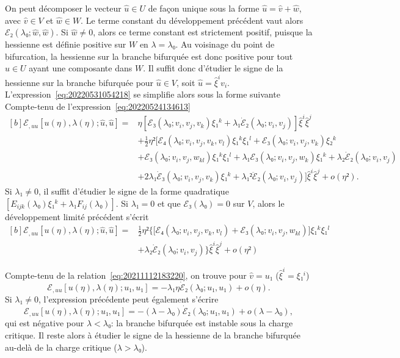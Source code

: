 \documentclass[12pt, final]{scrartcl}
\theoremstyle{definition}
\begin{document}
On peut décomposer le vecteur \(\hat{u}∈U\) de façon unique sous la forme
\(\hat{u} = \hat{v} + \hat{w}\), avec \(\hat{v}∈V\) et \(\hat{w}∈W\). Le terme
constant du développement précédent vaut alors \(ℰ₂(λ₀; \hat{w}, \hat{w})\). Si
\(\hat{w} ≠ 0\), alors ce terme constant est strictement positif, puisque la
hessienne est définie positive sur \(W\) en \(λ = λ₀\). Au voisinage du point de
bifurcation, la hessienne sur la branche bifurquée est donc positive pour tout
\(\hat{u}∈U\) ayant une composante dans \(W\). Il suffit donc d'étudier le signe
de la hessienne sur la branche bifurquée pour \(\hat{u}∈V\), soit
\(\hat{u} = \hat{ξ}^i v_i\). L'expression~\eqref{eq:20220531054218} se simplifie
alors sous la forme suivante Compte-tenu de
l'expression~\eqref{eq:20220524134613}
\begin{equation}
  \begin{aligned}[b]
    ℰ_{, uu}[u(η), λ(η); \hat{u}, \hat{u}] ={}
    & η [ℰ₃(λ₀; v_i, v_j, v_k) ξ₁^k + λ₁ \dot{ℰ}₂(λ₀; v_i, v_j)] \hat{ξ}^i \hat{ξ}^j\\
    & + \tfrac{1}{2} η² \bigl[ℰ₄(λ₀; v_i, v_j, v_k, v_l) ξ₁^k ξ₁^l + ℰ₃(λ₀; v_i, v_j, v_k) ξ₂^k\\
    & + ℰ₃(λ₀; v_i, v_j, w_{k l}) ξ₁^k ξ₁^l + λ₁ ℰ₃(λ₀; v_i, v_j, w_k) ξ₁^k + λ₂ \dot{ℰ}₂(λ₀; v_i, v_j)\\
    & + 2 λ₁ \dot{ℰ}₃(λ₀; v_i, v_j, v_k) ξ₁^k + λ₁² \ddot{ℰ}₂(λ₀; v_i, v_j)\bigr] \hat{ξ}^i \hat{ξ}^j + o(η²).
  \end{aligned}
\end{equation}
Si \(λ₁ ≠ 0\), il suffit d'étudier le signe de la forme quadratique
\([E_{i j k}(λ₀) ξ₁^k + λ₁ F_{i j}(λ₀)].\) Si \(λ₁ = 0\) et que \(ℰ₃(λ₀) = 0\)
sur \(V\), alors le développement limité précédent s'écrit
\begin{equation}
  \begin{aligned}[b]
    ℰ_{, uu} [u(η), λ(η); \hat{u}, \hat{u}] ={}
    & \tfrac{1}{2} η² \bigl\{ \bigl[ℰ₄(λ₀; v_i, v_j, v_k, v_l) + ℰ₃(λ₀; v_i, v_j, w_{k l})\bigr] ξ₁^k ξ₁^l\\
    & + λ₂ \dot{ℰ}₂(λ₀; v_i, v_j) \bigr\} \hat{ξ}^i \hat{ξ}^j + o(η²)
  \end{aligned}
\end{equation}

Compte-tenu de la relation~\eqref{eq:20211112183220}, on trouve pour
\(\hat{v} = u₁\) (\(\hat{ξ}^i = ξ₁^i\))
\begin{equation}
 ℰ_{, uu} [u(η), λ(η); u₁, u₁] = -λ₁ η \dot{ℰ}₂(λ₀; u₁, u₁) + o(η).
\end{equation}
Si \(λ₁ \neq 0\), l'expression précédente peut également s'écrire
\begin{equation}
 ℰ_{, uu} [u(η), λ(η); u₁, u₁] = -(λ - λ₀) \dot{ℰ}₂(λ₀; u₁, u₁) + o(λ - λ₀),
\end{equation}
qui est négative pour \(λ < λ₀\): la branche bifurquée est instable sous la
charge critique. Il reste alors à étudier le signe de la hessienne de la branche
bifurquée au-delà de la charge critique (\(λ > λ₀\)).
\end{document}
